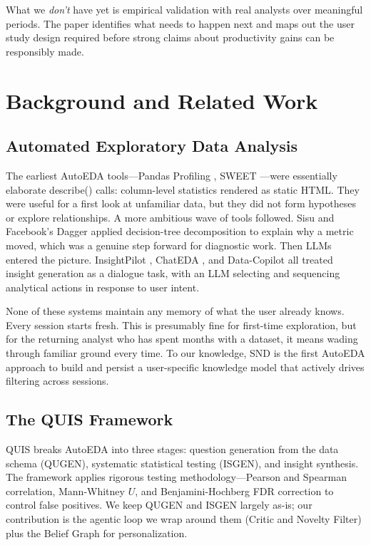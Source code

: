 \documentclass[conference]{IEEEtran}
\begin{document}
What we \textit{don't} have yet is empirical validation with real analysts
over meaningful periods. The paper identifies what needs to happen next and
maps out the user study design required before strong claims about productivity
gains can be responsibly made.

\section{Background and Related Work}
\label{sec:related}

\subsection{Automated Exploratory Data Analysis}

The earliest AutoEDA tools---Pandas Profiling \cite{pandas_profiling},
SWEET \cite{sweet2017}---were essentially elaborate describe() calls:
column-level statistics rendered as static HTML. They were useful for
a first look at unfamiliar data, but they did not form hypotheses or
explore relationships. A more ambitious wave of tools followed. Sisu
\cite{sisu} and Facebook's Dagger \cite{dagger2019} applied
decision-tree decomposition to explain why a metric moved, which was
a genuine step forward for diagnostic work. Then LLMs entered the
picture. InsightPilot \cite{wang2023insightpilot}, ChatEDA
\cite{chateda2024}, and Data-Copilot \cite{datacopilot2023} all
treated insight generation as a dialogue task, with an LLM selecting
and sequencing analytical actions in response to user intent.

None of these systems maintain any memory of what the user already
knows. Every session starts fresh. This is presumably fine for first-time
exploration, but for the returning analyst who has spent months with
a dataset, it means wading through familiar ground every time.
To our knowledge, SND is the first AutoEDA approach to build and
persist a user-specific knowledge model that actively drives filtering
across sessions.

\subsection{The QUIS Framework}

QUIS \cite{quis2024emnlp} breaks AutoEDA into three stages: question
generation from the data schema (QUGEN), systematic statistical testing
(ISGEN), and insight synthesis. The framework applies rigorous testing
methodology---Pearson and Spearman correlation, Mann-Whitney $U$, and
Benjamini-Hochberg FDR correction to control false positives. We keep
QUGEN and ISGEN largely as-is; our contribution is the agentic loop
we wrap around them (Critic and Novelty Filter) plus the Belief Graph
for personalization.
\end{document}
